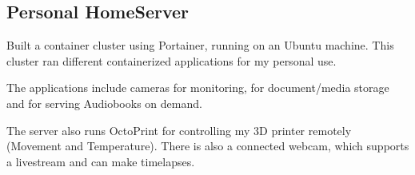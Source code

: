 \documentclass[]{plushcv}
\begin{document}
\begin{minipage}[t]{0.8\textwidth}
\subsection{Personal HomeServer}
\begin{tightemize}
\item[\textbullet{}] Built a container cluster using Portainer, running on an Ubuntu machine. This cluster ran different containerized applications for my personal use. 
\item[\textbullet{}] The applications include cameras for monitoring, for document/media storage and for serving Audiobooks on demand.
\item[\textbullet{}] The server also runs OctoPrint for controlling my 3D printer remotely (Movement and Temperature). There is also a connected webcam, which supports a livestream and can make timelapses.
\end{tightemize}
\sectionsep


%
%

\end{minipage} 
\hfill
\end{document}
